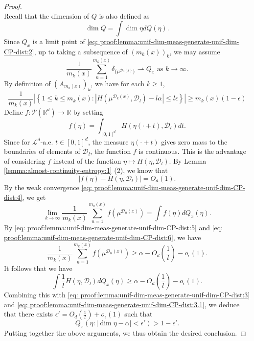 \documentclass[a4paper,11pt]{amsart}
\theoremstyle{definition}
\numberwithin{equation}{section}
\def\to{\rightarrow}
\def\D{\mathcal{D}}
\def\cP{\mathcal P}
\def\R{\mathbb R}
\begin{document}
\begin{proof}
\begin{equation}
\end{equation}
Recall that the dimension of $Q$ is also defined as 
\begin{equation}\label{eq: proof:lemma:unif-dim-meas-generate-unif-dim-CP-dist:3.1}
\dim Q = \int \dim\eta dQ(\eta).
\end{equation}
Since $Q_x$ is a limit point of \eqref{eq: proof:lemma:unif-dim-meas-generate-unif-dim-CP-dist:2}, up to taking a subsequence of $(m_k(x))_k$, we may assume 
\begin{equation}\label{eq: proof:lemma:unif-dim-meas-generate-unif-dim-CP-dist:4}
\frac{1}{m_k(x)}\sum_{n=1}^{m_k(x)} \delta_{\{\mu^{\D_n(x)}\}}  \rightharpoonup  Q_x \textrm{ as } k\to \infty.
\end{equation}
By definition of $(A_{m_k(x)})_k$, we have for each $k\ge 1$, 
\begin{equation}\label{eq: proof:lemma:unif-dim-meas-generate-unif-dim-CP-dist:5}
\frac{1}{m_k(x)}\left| \left\{ 1\le k\le m_k(x): \left|H(\mu^{\D_k(x)},\D_l)-l\alpha\right| \le l \epsilon \right\} \right| \ge m_k(x)(1-\epsilon)
\end{equation}
Define $f:\cP(\R^d)\to \R$ by setting
\[
f(\eta)=\int_{[0,1]^d}H\left(\eta(\cdot+t),\D_l\right)dt.
\]
Since for $\mathcal{L}^d$-a.e.  $t\in [0,1]^d$, the measure $\eta(\cdot+t)$ gives zero mass to the boundaries of elements of $\D_l$, the function $f$ is continuous.  This is the advantage of considering $f$ instead of the function $\eta\mapsto H(\eta,\D_l)$.  By Lemma \ref{lemma:almost-continuity-entropy:1} (2), we know that 
\begin{equation}\label{eq: proof:lemma:unif-dim-meas-generate-unif-dim-CP-dist:6}
\left|f(\eta)-H(\eta,\D_l)\right| = O_d(1). 
\end{equation}
By the weak convergence \eqref{eq: proof:lemma:unif-dim-meas-generate-unif-dim-CP-dist:4},  we get 
\[
\lim_{k\to\infty}\frac{1}{m_k(x)}\sum_{n=1}^{m_k(x)}f(\mu^{\D_n(x)})  = \int f(\eta)  dQ_x(\eta).
\]
By \eqref{eq: proof:lemma:unif-dim-meas-generate-unif-dim-CP-dist:5} and \eqref{eq: proof:lemma:unif-dim-meas-generate-unif-dim-CP-dist:6},  we have
\[
\frac{1}{m_k(x)}\sum_{n=1}^{m_k(x)}f(\mu^{\D_n(x)})  \ge \alpha-O_d(\frac{1}{l})-o_\epsilon(1).
\]
It follows that we have
\[
\int \frac{1}{l} H(\eta,\D_l)dQ_x(\eta) \ge  \alpha-O_d(\frac{1}{l})-o_\epsilon(1).
\]
Combining this with \eqref{eq: proof:lemma:unif-dim-meas-generate-unif-dim-CP-dist:3} and \eqref{eq: proof:lemma:unif-dim-meas-generate-unif-dim-CP-dist:3.1},   we deduce that there exists $\epsilon'=O_d(\frac{1}{l})+o_\epsilon(1)$ such that 
\[
Q_x\left(\eta: |\dim \eta-\alpha|<\epsilon'\right)>1-\epsilon'.
\]
Putting together the above arguments, we thus obtain the desired conclusion.
\end{proof}
\end{document}
